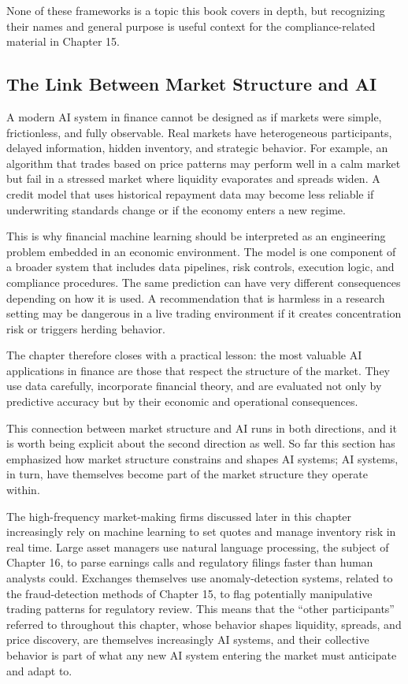 \documentclass[../ai_in_finance]{subfiles}
\begin{document}
None of these frameworks is a topic this book covers in depth, but recognizing their names and general purpose is useful context for the compliance-related material in Chapter 15.

\subsection{The Link Between Market Structure and AI}

A modern AI system in finance cannot be designed as if markets were simple, frictionless, and fully observable. Real markets have heterogeneous participants, delayed information, hidden inventory, and strategic behavior. For example, an algorithm that trades based on price patterns may perform well in a calm market but fail in a stressed market where liquidity evaporates and spreads widen. A credit model that uses historical repayment data may become less reliable if underwriting standards change or if the economy enters a new regime.

This is why financial machine learning should be interpreted as an engineering problem embedded in an economic environment. The model is one component of a broader system that includes data pipelines, risk controls, execution logic, and compliance procedures. The same prediction can have very different consequences depending on how it is used. A recommendation that is harmless in a research setting may be dangerous in a live trading environment if it creates concentration risk or triggers herding behavior.

The chapter therefore closes with a practical lesson: the most valuable AI applications in finance are those that respect the structure of the market. They use data carefully, incorporate financial theory, and are evaluated not only by predictive accuracy but by their economic and operational consequences.

This connection between market structure and AI runs in both directions, and it is worth being explicit about the second direction as well. So far this section has emphasized how market structure constrains and shapes AI systems; AI systems, in turn, have themselves become part of the market structure they operate within.

The high-frequency market-making firms discussed later in this chapter increasingly rely on machine learning to set quotes and manage inventory risk in real time. Large asset managers use natural language processing, the subject of Chapter 16, to parse earnings calls and regulatory filings faster than human analysts could. Exchanges themselves use anomaly-detection systems, related to the fraud-detection methods of Chapter 15, to flag potentially manipulative trading patterns for regulatory review. This means that the ``other participants'' referred to throughout this chapter, whose behavior shapes liquidity, spreads, and price discovery, are themselves increasingly AI systems, and their collective behavior is part of what any new AI system entering the market must anticipate and adapt to.
\end{document}
